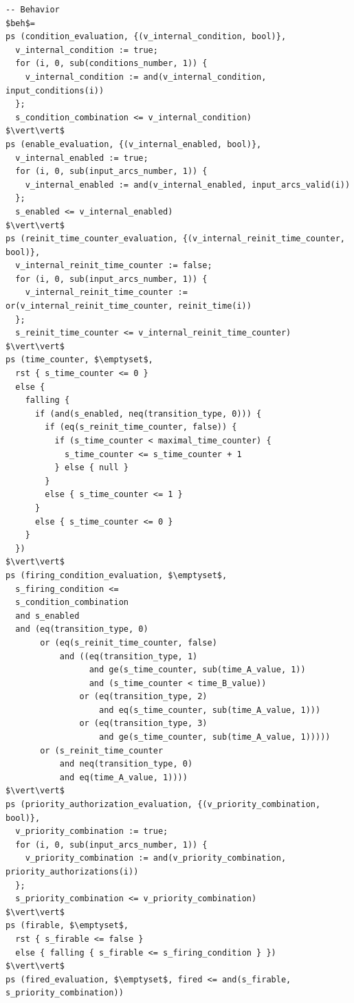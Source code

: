 \documentclass[pdflatex,sn-mathphys]{sn-jnl}%
\theoremstyle{thmstyleone}%
\theoremstyle{thmstyletwo}%
\theoremstyle{thmstylethree}%
\begin{document}
\begin{appendices}
\begin{lstlisting}
-- Behavior
$beh$=
ps (condition_evaluation, {(v_internal_condition, bool)},
  v_internal_condition := true;
  for (i, 0, sub(conditions_number, 1)) {
    v_internal_condition := and(v_internal_condition, input_conditions(i))
  };
  s_condition_combination <= v_internal_condition)
$\vert\vert$
ps (enable_evaluation, {(v_internal_enabled, bool)},
  v_internal_enabled := true;
  for (i, 0, sub(input_arcs_number, 1)) {
    v_internal_enabled := and(v_internal_enabled, input_arcs_valid(i))
  };
  s_enabled <= v_internal_enabled)
$\vert\vert$
ps (reinit_time_counter_evaluation, {(v_internal_reinit_time_counter, bool)},
  v_internal_reinit_time_counter := false;
  for (i, 0, sub(input_arcs_number, 1)) {
    v_internal_reinit_time_counter := or(v_internal_reinit_time_counter, reinit_time(i))
  };
  s_reinit_time_counter <= v_internal_reinit_time_counter)
$\vert\vert$
ps (time_counter, $\emptyset$,
  rst { s_time_counter <= 0 }
  else {
    falling {
      if (and(s_enabled, neq(transition_type, 0))) {
        if (eq(s_reinit_time_counter, false)) {
          if (s_time_counter < maximal_time_counter) {
            s_time_counter <= s_time_counter + 1
          } else { null }
        }
        else { s_time_counter <= 1 }
      }
      else { s_time_counter <= 0 }
    }
  })
$\vert\vert$
ps (firing_condition_evaluation, $\emptyset$, 
  s_firing_condition <= 
  s_condition_combination
  and s_enabled
  and (eq(transition_type, 0)
       or (eq(s_reinit_time_counter, false) 
           and ((eq(transition_type, 1) 
                 and ge(s_time_counter, sub(time_A_value, 1)) 
                 and (s_time_counter < time_B_value))
               or (eq(transition_type, 2) 
                   and eq(s_time_counter, sub(time_A_value, 1)))
               or (eq(transition_type, 3) 
                   and ge(s_time_counter, sub(time_A_value, 1)))))                              
       or (s_reinit_time_counter
           and neq(transition_type, 0)
           and eq(time_A_value, 1))))
$\vert\vert$
ps (priority_authorization_evaluation, {(v_priority_combination, bool)},
  v_priority_combination := true;
  for (i, 0, sub(input_arcs_number, 1)) {
    v_priority_combination := and(v_priority_combination, priority_authorizations(i))
  };
  s_priority_combination <= v_priority_combination)
$\vert\vert$
ps (firable, $\emptyset$,
  rst { s_firable <= false }
  else { falling { s_firable <= s_firing_condition } })
$\vert\vert$
ps (fired_evaluation, $\emptyset$, fired <= and(s_firable, s_priority_combination))
\end{lstlisting}


\end{appendices}
\end{document}
